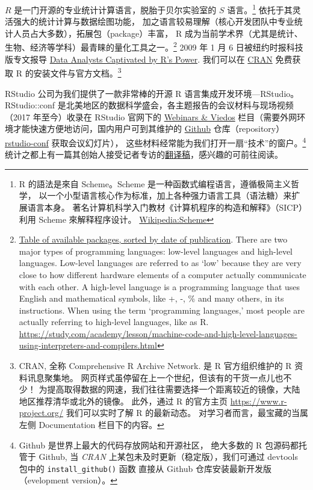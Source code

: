 \documentclass[11pt,hyperref]{ctexart}
\begin{document}
\href{https://www.r-project.org/}{\(R\)}
是一门开源的专业统计计算语言，脱胎于贝尔实验室的 \(S\) 语言。\footnote{R
  的語法是來自 Scheme。Scheme 是一种函数式编程语言，遵循极简主义哲学，
  以一个小型语言核心作为标准，加上各种强力语言工具（语法糖）来扩展语言本身。
  著名计算机科学入门教材《计算机程序的构造和解释》（SICP）利用 Scheme
  來解释程序设计。
  \href{https://www.wikiwand.com/zh/Scheme}{Wikipedia:Scheme}}
依托于其灵活强大的统计计算与数据绘图功能，
加之语言较易理解（核心开发团队中专业统计人员占大多数），拓展包（package）丰富，
R
成为当前学术界（尤其是统计、生物、经济等学科）最青睐的量化工具之一。\footnote{\href{https://cran.r-project.org/web/packages/available_packages_by_date.html}{Table
  of available packages, sorted by date of publication}. There are two
  major types of programming languages: low-level languages and
  high-level languages. Low-level languages are referred to as `low'
  because they are very close to how different hardware elements of a
  computer actually communicate with each other. A high-level language
  is a programming language that uses English and mathematical symbols,
  like +, -, \% and many others, in its instructions. When using the
  term `programming languages,' most people are actually referring to
  high-level languages, like as R.
  \url{https://study.com/academy/lesson/machine-code-and-high-level-languages-using-interpreters-and-compilers.html}}
2009 年 1 月 6 日被纽约时报科技版专文报导
\href{https://www.nytimes.com/2009/01/07/technology/business-computing/07program.html}{Data
Analysts Captivated by R's Power}. 我们可以在
\href{https://cran.r-project.org/mirrors.html}{CRAN} 免费获取 R
的安装文件与官方文档。\footnote{CRAN, 全称 Comprehensive R Archive
  Network. 是 R 官方组织维护的 R 资料讯息聚集地。
  网页样式虽停留在上一个世纪，但该有的干货一点儿也不少！
  为提高取得数据的网速，我们往往需要选择一个距离较近的镜像，大陆地区推荐清华或北外的镜像。
  此外，通过 R 的官方主页 \url{https://www.r-project.org/}
  我们可以实时了解 R 的最新动态。 对学习者而言，最宝藏的当属左侧
  Documentation 栏目下的内容。}

RStudio 公司为我们提供了一款非常棒的开源 R 语言集成开发环境---RStudio。
RStudio::conf
是北美地区的数据科学盛会，各主题报告的会议材料与现场视频（2017
年至今）收录在 RStudio 官网下的
\href{https://rstudio.com/resources/webinars/}{Webinars \& Viedos}
栏目（需要外网环境才能快速方便地访问，国内用户可到其维护的
\href{https://github.com/jun3970}{Github} 仓库（repository）
\href{https://github.com/rstudio/rstudio-conf}{rstudio-conf}
获取会议幻灯片），
这些材料经常能为我们打开一扇``技术''的窗户。\footnote{Github
  是世界上最大的代码存放网站和开源社区， 绝大多数的 R 包源码都托管于
  Github, 当 \emph{CRAN} 上某包未及时更新（稳定版），我们可通过 devtools
  包中的 \texttt{install\_github()} 函数 直接从 Github
  仓库安装最新开发版（evelopment version）。}
统计之都上有一篇其创始人接受记者专访的\href{https://cosx.org/2016/11/interview-j-j-allaire/}{翻译稿}，感兴趣的可前往阅读。
\end{document}
